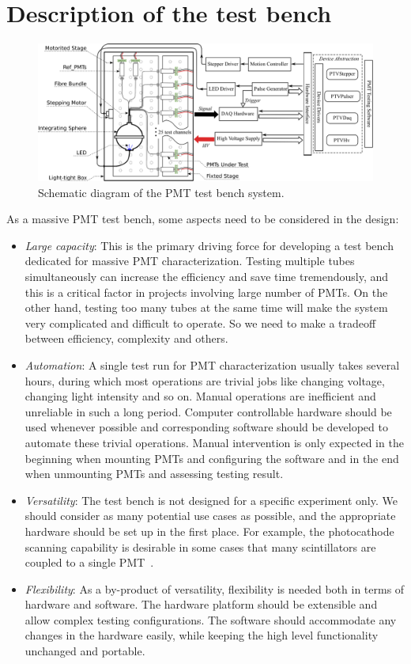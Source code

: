 \documentclass[review, times]{elsarticle}
\begin{document}
\section{Description of the test bench}
\label{sec:description}

\begin{figure}
 \centering
 \includegraphics[width=160mm]{testbench_overview}
\caption{Schematic diagram of the PMT test bench system.}
\label{fig:testbench_overveiw}
\end{figure}

As a massive PMT test bench, some aspects need to be considered in the design:
\begin{itemize}
 \item \textit{Large capacity}: This is the primary driving force for developing a test bench dedicated for massive PMT characterization.
 Testing multiple tubes simultaneously can increase the efficiency and save time tremendously, and this is a critical factor in projects involving large number of PMTs. On the other hand, testing too many tubes at the same time will make the system very complicated and difficult to operate. So we need to make a tradeoff between efficiency, complexity and others.
 \item \textit{Automation}: A single test run for PMT characterization usually takes several hours, during which most operations are trivial jobs like changing voltage, changing light intensity and so on.
 Manual operations are inefficient and unreliable in such a long period.
 Computer controllable hardware should be used whenever possible and corresponding software should be developed to automate these trivial operations.
 Manual intervention is only expected in the beginning when mounting PMTs and configuring the software and in the end when unmounting PMTs and assessing testing result. 
 \item \textit{Versatility}: The test bench is not designed for a specific experiment only. We should consider as many potential use cases as possible, and the appropriate hardware should be set up in the first place.
 For example, the photocathode scanning capability is desirable in some cases that many scintillators are coupled to a single PMT~\cite{tof_pet}. 
 \item \textit{Flexibility}: As a by-product of versatility, flexibility is needed both in terms of hardware and software.
 The hardware platform should be extensible and allow complex testing configurations.
 The software should accommodate any changes in the hardware easily, while keeping the high level functionality unchanged and portable. 
\end{itemize}
\end{document}
